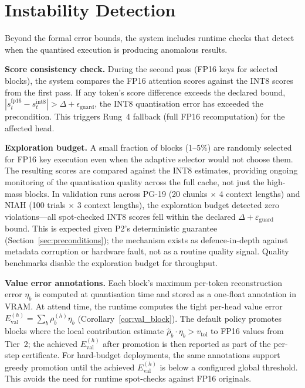 \documentclass[10pt,twocolumn,a4paper]{article}
\theoremstyle{definition}
\theoremstyle{remark}
\begin{document}
\section{Instability Detection}
\label{sec:instability}

Beyond the formal error bounds, the system includes runtime checks that detect when the quantised execution is producing anomalous results.

\textbf{Score consistency check.}  During the second pass (FP16 keys for selected blocks), the system compares the FP16 attention scores against the INT8 scores from the first pass.  If any token's score difference exceeds the declared bound, $|s_t^{\mathrm{fp16}} - s_t^{\mathrm{int8}}| > \Delta + \epsilon_{\mathrm{guard}}$, the INT8 quantisation error has exceeded the precondition.  This triggers Rung~4 fallback (full FP16 recomputation) for the affected head.

\textbf{Exploration budget.}  A small fraction of blocks (1--5\%) are randomly selected for FP16 key execution even when the adaptive selector would not choose them.  The resulting scores are compared against the INT8 estimates, providing ongoing monitoring of the quantisation quality across the full cache, not just the high-mass blocks.  In validation runs across PG-19 (20 chunks $\times$ 4 context lengths) and NIAH (100 trials $\times$ 3 context lengths), the exploration budget detected zero violations---all spot-checked INT8 scores fell within the declared $\Delta + \varepsilon_{\mathrm{guard}}$ bound.  This is expected given P2's deterministic guarantee (Section~\ref{sec:preconditions}); the mechanism exists as defence-in-depth against metadata corruption or hardware fault, not as a routine quality signal.  Quality benchmarks disable the exploration budget for throughput.

\textbf{Value error annotations.}  Each block's maximum per-token reconstruction error $\eta_b$ is computed at quantisation time and stored as a one-float annotation in VRAM\@.  At attend time, the runtime computes the tight per-head value error $E_{\mathrm{val}}^{(h)} = \sum_b \rho_b^{(h)} \eta_b$ (Corollary~\ref{cor:val_block}).  The default policy promotes blocks where the local contribution estimate $\hat{\rho}_b \cdot \eta_b > v_{\mathrm{tol}}$ to FP16 values from Tier~2; the achieved $E_{\mathrm{val}}^{(h)}$ after promotion is then reported as part of the per-step certificate.  For hard-budget deployments, the same annotations support greedy promotion until the achieved $E_{\mathrm{val}}^{(h)}$ is below a configured global threshold.  This avoids the need for runtime spot-checks against FP16 originals.
\end{document}
